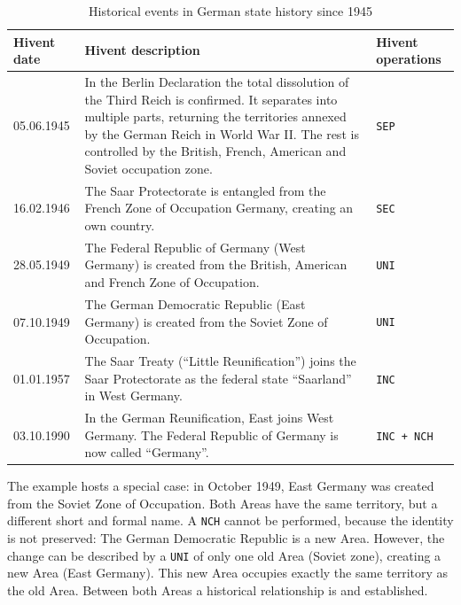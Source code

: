 \begin{table}[ht]
\begin{center}
\begin{tabular}{l p{8.8cm} l}
  \toprule
  Hivent date & Hivent description & Hivent operations \\
  \midrule

    05.06.1945
  & \normalsize{In the Berlin Declaration the total dissolution of the Third Reich is confirmed. It separates into multiple parts, returning the territories annexed by the German Reich in World War II. The rest is controlled by the British, French, American and Soviet occupation zone.}
  & \texttt{SEP} \\[1.5em]

    16.02.1946
  & \normalsize{The Saar Protectorate is entangled from the French Zone of Occupation Germany, creating an own country.}
  & \texttt{SEC} \\[1.5em]

    28.05.1949
  & \normalsize{The Federal Republic of Germany (West Germany) is created from the British, American and French Zone of Occupation.}
  & \texttt{UNI} \\[1.5em]

    07.10.1949
  & \normalsize{The German Democratic Republic (East Germany) is created from the Soviet Zone of Occupation.}
  & \texttt{UNI} \\[1.5em]

    01.01.1957
  & \normalsize{The Saar Treaty (``Little Reunification'') joins the Saar Protectorate as the federal state ``Saarland'' in West Germany.}
  & \texttt{INC} \\[1.5em]

    03.10.1990
  & \normalsize{In the German Reunification, East joins West Germany. The Federal Republic of Germany is now called ``Germany''.}
  & \texttt{INC + NCH} \\[1.5em]

  \bottomrule
\end{tabular}
\caption{Historical events in German state history since 1945}
\label{tab:german_history_since_1945}
\end{center}
\end{table}

\vspace{-1em}

The example hosts a special case: in October 1949, East Germany was created from the Soviet Zone of Occupation. Both Areas have the same territory, but a different short and formal name. A \texttt{NCH} cannot be performed, because the identity is not preserved: The German Democratic Republic is a new Area. However, the change can be described by a \texttt{UNI} of only one old Area (Soviet zone), creating a new Area (East Germany). This new Area occupies exactly the same territory as the old Area. Between both Areas a historical relationship is and established.

